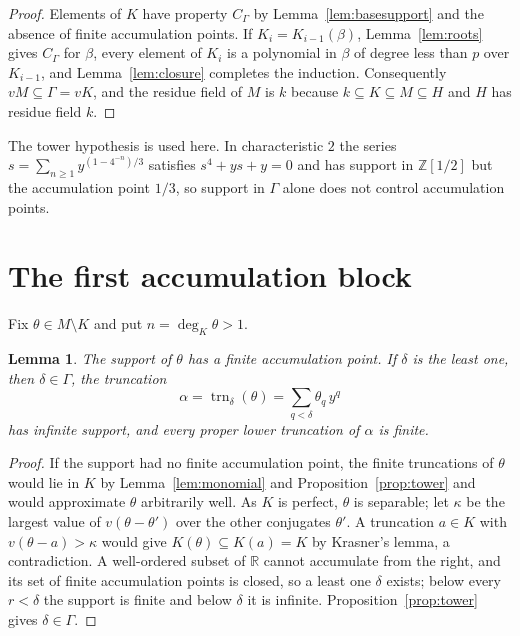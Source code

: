 \documentclass[11pt]{article}
\newtheorem{lemma}{Lemma}[section]
\newcommand{\R}{\mathbb R}
\newcommand{\trn}{\operatorname{trn}}
\begin{document}
\begin{proof}
Elements of $K$ have property $C_\Gamma$ by Lemma~\ref{lem:basesupport} and the absence of finite accumulation points. If $K_i=K_{i-1}(\beta)$, Lemma~\ref{lem:roots} gives $C_\Gamma$ for $\beta$, every element of $K_i$ is a polynomial in $\beta$ of degree less than $p$ over $K_{i-1}$, and Lemma~\ref{lem:closure} completes the induction. Consequently $vM\subseteq\Gamma=vK$, and the residue field of $M$ is $k$ because $k\subseteq K\subseteq M\subseteq H$ and $H$ has residue field $k$.
\end{proof}

The tower hypothesis is used here. In characteristic $2$ the series $s=\sum_{n\ge1}y^{(1-4^{-n})/3}$ satisfies $s^4+ys+y=0$ and has support in $\mathbb Z[1/2]$ but the accumulation point $1/3$, so support in $\Gamma$ alone does not control accumulation points.

\section{The first accumulation block}\label{sec:block}

Fix $\theta\in M\setminus K$ and put $n=\deg_K\theta>1$.

\begin{lemma}\label{lem:accumulation}
The support of $\theta$ has a finite accumulation point. If $\delta$ is the least one, then $\delta\in\Gamma$, the truncation
\[
\alpha=\trn_\delta(\theta)=\sum_{q<\delta}\theta_q\,y^q
\]
has infinite support, and every proper lower truncation of $\alpha$ is finite.
\end{lemma}

\begin{proof}
If the support had no finite accumulation point, the finite truncations of $\theta$ would lie in $K$ by Lemma~\ref{lem:monomial} and Proposition~\ref{prop:tower} and would approximate $\theta$ arbitrarily well. As $K$ is perfect, $\theta$ is separable; let $\kappa$ be the largest value of $v(\theta-\theta')$ over the other conjugates $\theta'$. A truncation $a\in K$ with $v(\theta-a)>\kappa$ would give $K(\theta)\subseteq K(a)=K$ by Krasner's lemma, a contradiction. A well-ordered subset of $\R$ cannot accumulate from the right, and its set of finite accumulation points is closed, so a least one $\delta$ exists; below every $r<\delta$ the support is finite and below $\delta$ it is infinite. Proposition~\ref{prop:tower} gives $\delta\in\Gamma$.
\end{proof}
\end{document}
